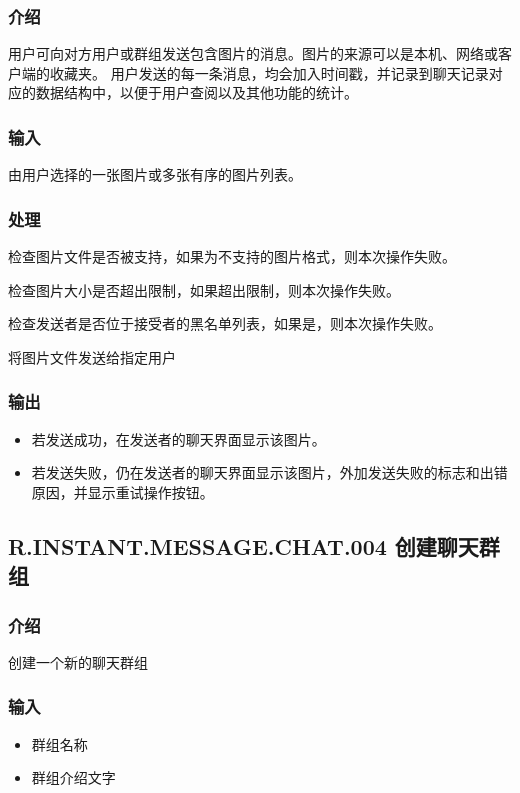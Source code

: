 \subsubsection{介绍}
用户可向对方用户或群组发送包含图片的消息。图片的来源可以是本机、网络或客户端的收藏夹。
{
	\color{red}
	用户发送的每一条消息，均会加入时间戳，并记录到聊天记录对应的数据结构中，以便于用户查阅以及其他功能的统计。
}
\subsubsection{输入}
由用户选择的一张图片或多张有序的图片列表。
\subsubsection{处理}
\begin{itemize}
	{
		\color{red}
		\item 检查图片文件是否被支持，如果为不支持的图片格式，则本次操作失败。
	}
	\item 检查图片大小是否超出限制，如果超出限制，则本次操作失败。
	{
		\color{red}
		\item 检查发送者是否位于接受者的黑名单列表，如果是，则本次操作失败。
	}
	\item 将图片文件发送给指定用户
\end{itemize}
\subsubsection{输出}
\begin{itemize}
	\item 若发送成功，在{\color{red}发送者的}聊天界面显示该图片。
	\item 若发送失败，仍在{\color{red}发送者的}聊天界面显示该图片，外加发送失败的标志和出错原因，并显示重试操作按钮。
	\end{itemize}
\subsection{R.INSTANT.MESSAGE.CHAT.004 创建聊天群组}
\subsubsection{介绍}
创建一个新的聊天群组
\subsubsection{输入}
\begin{itemize}
	\item 群组名称
	\item 群组介绍文字
\end{itemize}
